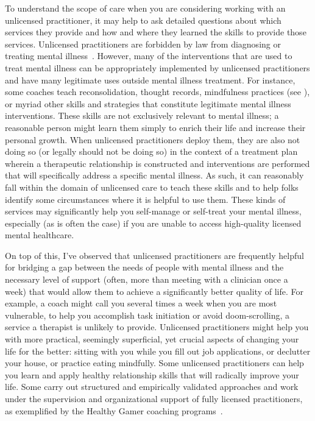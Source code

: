 \documentclass[11pt,oneside]{book}
\let\cite\parencite
\begin{document}
To understand the scope of care when you are considering working with an unlicensed practitioner, it may help to ask detailed questions about which services they provide and how and where they learned the skills to provide those services. Unlicensed practitioners are forbidden by law from diagnosing or treating mental illness~\cite{aboujaoude2020coachingVSTherapy,healthyGamerCoaching}. However, many of the interventions that are used to treat mental illness can be appropriately implemented by unlicensed practitioners and have many legitimate uses outside mental illness treatment. For instance, some coaches teach reconsolidation, thought records, mindfulness practices (see \textcite{rain}), or myriad other skills and strategies that constitute legitimate mental illness interventions. These skills are not exclusively relevant to mental illness; a reasonable person might learn them simply to enrich their life and increase their personal growth. When unlicensed practitioners deploy them, they are also not doing so (or legally should not be doing so) in the context of a treatment plan wherein a therapeutic relationship is constructed and interventions are performed that will specifically address a specific mental illness. As such, it can reasonably fall within the domain of unlicensed care to teach these skills and to help folks identify some circumstances where it is helpful to use them. These kinds of services may significantly help you self-manage or self-treat your mental illness, especially (as is often the case) if you are unable to access high-quality licensed mental healthcare.

On top of this, I've observed that unlicensed practitioners are frequently helpful for bridging a gap between the needs of people with mental illness and the necessary level of support (often, more than meeting with a clinician once a week) that would allow them to achieve a significantly better quality of life. For example, a coach might call you several times a week when you are most vulnerable, to help you accomplish task initiation or avoid doom-scrolling, a service a therapist is unlikely to provide. Unlicensed practitioners might help you with more practical, seemingly superficial, yet crucial aspects of changing your life for the better: sitting with you while you fill out job applications, or declutter your house, or practice eating mindfully. Some unlicensed practitioners can help you learn and apply healthy relationship skills that will radically improve your life. Some carry out structured and empirically validated approaches and work under the supervision and organizational support of fully licensed practitioners, as exemplified by the Healthy Gamer coaching programs~\cite{healthyGamerMethodology}.
\end{document}
